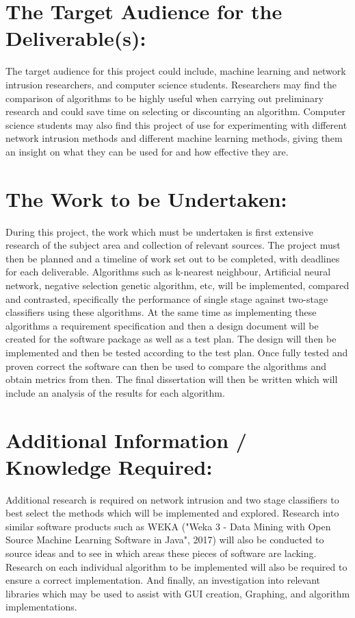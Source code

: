 \section*{The Target Audience for the Deliverable(s):}
\noindent The target audience for this project could include, machine learning and network intrusion researchers, and computer science students. Researchers may find the comparison of algorithms to be highly useful when carrying out preliminary research and could save time on selecting or discounting an algorithm. Computer science students may also find this project of use for experimenting with different network intrusion methods and different machine learning methods, giving them an insight on what they can be used for and how effective they are. \\


\section*{The Work to be Undertaken:}
\noindent During this project, the work which must be undertaken is first extensive research of the subject area and collection of relevant sources. The project must then be planned and a timeline of work set out to be completed, with deadlines for each deliverable. Algorithms such as k-nearest neighbour, Artificial neural network, negative selection genetic algorithm, etc, will be implemented, compared and contrasted, specifically the performance of single stage against two-stage classifiers using these algorithms. At the same time as implementing these algorithms a requirement specification and then a design document will be created for the software package as well as a test plan. The design will then be implemented and then be tested according to the test plan. Once fully tested and proven correct the software can then be used to compare the algorithms and obtain metrics from then. The final dissertation will then be written which will include an analysis of the results for each algorithm. \\


\section*{Additional Information / Knowledge Required:}
\noindent Additional research is required on network intrusion and two stage classifiers to best select the methods which will be implemented and explored. Research into similar software products such as WEKA ("Weka 3 - Data Mining with Open Source Machine Learning Software in Java", 2017) will also be conducted to source ideas and to see in which areas these pieces of software are lacking. Research on each individual algorithm to be implemented will also be required to ensure a correct implementation. And finally, an investigation into relevant libraries which may be used to assist with GUI creation, Graphing, and algorithm implementations. \\


